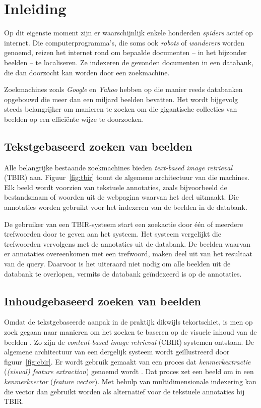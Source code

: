 \chapter{Inleiding}

Op dit eigenste moment zijn er waarschijnlijk enkele honderden \emph{spiders} actief op internet.
Die computerprogramma's, die soms ook \emph{robots} of \emph{wanderers} worden genoemd, reizen
het internet rond om bepaalde documenten -- in het bijzonder beelden -- te localiseren. Ze indexeren
de gevonden documenten in een databank, die dan doorzocht kan worden door een zoekmachine. 

Zoekmachines zoals \emph{Google} en \emph{Yahoo} hebben op die manier reeds databanken
opgebouwd die meer dan een miljard beelden bevatten. Het wordt bijgevolg steeds belangrijker
om manieren te zoeken om die gigantische collecties van beelden op een effici\"ente wijze
te doorzoeken.


\section{Tekstgebaseerd zoeken van beelden}

Alle belangrijke bestaande zoekmachines bieden \emph{text-based image retrieval} (TBIR) aan. 
Figuur~\ref{fig:tbir} toont de algemene architectuur van die machines. Elk beeld 
wordt voorzien van tekstuele annotaties, zoals bijvoorbeeld de 
bestandsnaam of woorden uit de webpagina waarvan het deel uitmaakt. Die annotaties
worden gebruikt voor het indexeren van de beelden in de databank.

De gebruiker van een TBIR-systeem start een zoekactie door \'e\'en of meerdere trefwoorden door te geven
aan het systeem. Het systeem vergelijkt die trefwoorden vervolgens met de annotaties uit
de databank. De beelden waarvan er annotaties overeenkomen met een trefwoord, maken
deel uit van het resultaat van de query. Daarvoor is het uiteraard niet nodig om alle beelden
uit de databank te overlopen, vermits de databank ge\"indexeerd is op de annotaties. 

\section{Inhoudgebaseerd zoeken van beelden}

Omdat de tekstgebaseerde aanpak in de praktijk dikwijls tekortschiet, is men op zoek gegaan 
naar manieren om het zoeken te baseren op de visuele inhoud van de beelden 
\cite{smeulders:cbir_end_of_early_years}. Zo zijn de \emph{content-based image retrieval} (CBIR) systemen 
\cite{veltcamp:cbirs} ontstaan. 
De algemene architectuur van een dergelijk systeem wordt ge\"illustreerd door
figuur~\ref{fig:cbir}. Er wordt gebruik gemaakt van een proces dat \emph{kenmerkextractie}
(\emph{(visual) feature extraction}) genoemd wordt \cite{rui:image_retr}. Dat proces zet een beeld om in een 
\emph{kenmerkvector} (\emph{feature vector}). Met behulp van multidimensionale indexering kan die
vector dan gebruikt worden als alternatief voor de tekstuele annotaties bij TBIR.


